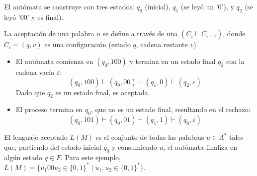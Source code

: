 \begin{ejemplo}
El autómata se construye con tres estados: $q_0$ (inicial), $q_1$ (se leyó un '0'), y $q_2$ (se leyó '00' y es final). 

\begin{figure}[H]
    \centering
    \label{fig:afd_00}
\end{figure}

 La aceptación de una palabra $u$ se define a través de una  $(C_i \vdash C_{i+1})$, donde $C_i = (q, v)$ es una configuración (estado $q$, cadena restante $v$).

\begin{itemize}
    \item {} El autómata comienza en $(q_0, 100)$ y termina en un estado final $q_2$ con la cadena vacía $\varepsilon$:
    \[ (q_0, 100) \vdash (q_0, 00) \vdash (q_1, 0) \vdash (q_2, \varepsilon) \]
    Dado que $q_2$ es un estado final,  es aceptada.

    \item {} El proceso termina en $q_0$, que no es un estado final, resultando en el rechazo:
    \[ (q_0, 101) \vdash (q_0, 01) \vdash (q_1, 1) \vdash (q_0, \varepsilon) \]
\end{itemize}

El lenguaje aceptado $L(M)$ es el conjunto de todas las palabras $u \in A^*$ tales que, partiendo del estado inicial $q_0$ y consumiendo $u$, el autómata finaliza en algún estado $q \in F$. Para este ejemplo, $L(M) = \{u_1 00 u_2 \in \{0, 1\}^* \mid u_1, u_2 \in \{0, 1\}^*\}$.
\end{ejemplo}







